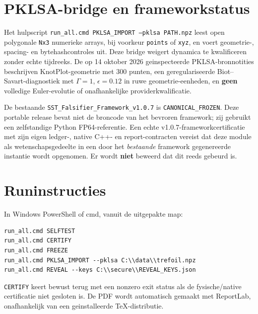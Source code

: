 \documentclass[11pt,a4paper]{article}
\begin{document}
\section{PKLSA-bridge en frameworkstatus}
Het hulpscript \texttt{run\_all.cmd PKLSA\_IMPORT --pklsa PATH.npz} leest
open polygonale \texttt{Nx3} numerieke arrays, bij voorkeur \texttt{points} of
\texttt{xyz}, en voert geometrie-, spacing- en bytehashcontroles uit.
Deze bridge weigert dynamica te kwalificeren zonder echte tijdreeks.
De op 14 oktober 2026 geinspecteerde PKLSA-bronnotities beschrijven
KnotPlot-geometrie met 300 punten, een geregulariseerde Biot--Savart-diagnostiek
met $\Gamma=1$, $\epsilon=0.12$ in ruwe geometrie-eenheden, en \textbf{geen}
volledige Euler-evolutie of onafhankelijke providerkwalificatie.

De bestaande \texttt{SST\_Falsifier\_Framework\_v1.0.7} is
\texttt{CANONICAL\_FROZEN}. Deze portable release bevat niet de broncode van
het bevroren framework; zij gebruikt een zelfstandige Python FP64-referentie.
Een echte v1.0.7-frameworkcertificatie met zijn eigen ledger-, native C++- en
report-contracten vereist dat deze module als wetenschapsgedeelte in een door
het \emph{bestaande} framework gegenereerde instantie wordt opgenomen.
Er wordt \textbf{niet} beweerd dat dit reeds gebeurd is.

\section{Runinstructies}
In Windows PowerShell of cmd, vanuit de uitgepakte map:
\begin{lstlisting}
run_all.cmd SELFTEST
run_all.cmd CERTIFY
run_all.cmd FREEZE
run_all.cmd PKLSA_IMPORT --pklsa C:\\data\\trefoil.npz
run_all.cmd REVEAL --keys C:\\secure\\REVEAL_KEYS.json
\end{lstlisting}
\texttt{CERTIFY} keert bewust terug met een nonzero exit status als de
fysische/native certificatie niet gesloten is. De PDF wordt automatisch gemaakt
met ReportLab, onafhankelijk van een geinstalleerde TeX-distributie.
\end{document}
